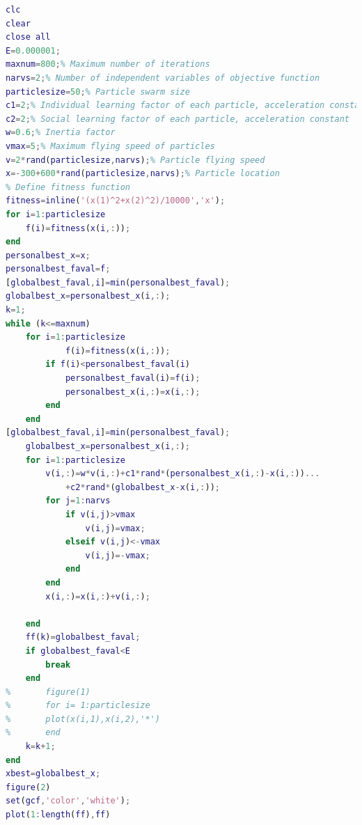\documentclass{apmcmthesis}
\begin{document}
\begin{lstlisting}[language=matlab,caption={PSO algorithm}]
clc
clear 
close all
E=0.000001; 
maxnum=800;% Maximum number of iterations
narvs=2;% Number of independent variables of objective function
particlesize=50;% Particle swarm size
c1=2;% Individual learning factor of each particle, acceleration constant
c2=2;% Social learning factor of each particle, acceleration constant
w=0.6;% Inertia factor
vmax=5;% Maximum flying speed of particles
v=2*rand(particlesize,narvs);% Particle flying speed
x=-300+600*rand(particlesize,narvs);% Particle location
% Define fitness function
fitness=inline('(x(1)^2+x(2)^2)/10000','x');
for i=1:particlesize
	f(i)=fitness(x(i,:));	
end
personalbest_x=x;
personalbest_faval=f;
[globalbest_faval,i]=min(personalbest_faval);
globalbest_x=personalbest_x(i,:); 
k=1;
while (k<=maxnum)
	for i=1:particlesize
			f(i)=fitness(x(i,:));
		if f(i)<personalbest_faval(i)
			personalbest_faval(i)=f(i);
			personalbest_x(i,:)=x(i,:);
		end
	end
[globalbest_faval,i]=min(personalbest_faval);
	globalbest_x=personalbest_x(i,:);
	for i=1:particlesize
		v(i,:)=w*v(i,:)+c1*rand*(personalbest_x(i,:)-x(i,:))...
			+c2*rand*(globalbest_x-x(i,:));
		for j=1:narvs
			if v(i,j)>vmax
				v(i,j)=vmax;
			elseif v(i,j)<-vmax
				v(i,j)=-vmax;
            end
		end
		x(i,:)=x(i,:)+v(i,:);
 
    end
    ff(k)=globalbest_faval;
    if globalbest_faval<E
        break
    end
%       figure(1)
%       for i= 1:particlesize
%       plot(x(i,1),x(i,2),'*')
%       end
	k=k+1;
end
xbest=globalbest_x;
figure(2)
set(gcf,'color','white');
plot(1:length(ff),ff)

 \end{lstlisting}
\end{document}
